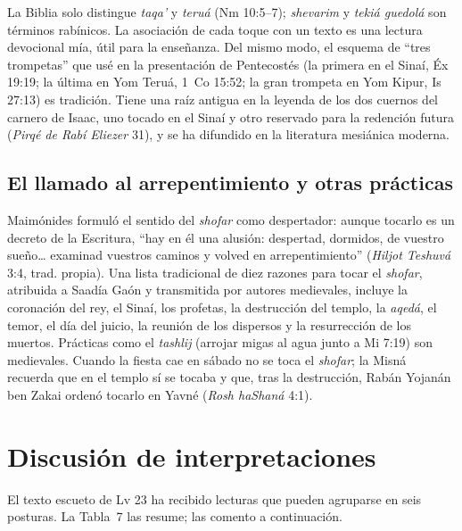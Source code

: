 \documentclass[11pt,letterpaper]{article}
\begin{document}
\begin{nota}[Precisión]
La Biblia solo distingue \emph{taqa'} y \emph{teruá} (Nm 10:5--7); \emph{shevarim} y \emph{tekiá guedolá} son términos rabínicos. La asociación de cada toque con un texto es una lectura devocional mía, útil para la enseñanza. Del mismo modo, el esquema de ``tres trompetas'' que usé en la presentación de Pentecostés (la primera en el Sinaí, Éx 19:19; la última en Yom Teruá, 1~Co 15:52; la gran trompeta en Yom Kipur, Is 27:13) es tradición. Tiene una raíz antigua en la leyenda de los dos cuernos del carnero de Isaac, uno tocado en el Sinaí y otro reservado para la redención futura (\emph{Pirqé de Rabí Eliezer} 31), y se ha difundido en la literatura mesiánica moderna.
\end{nota}

\subsection{El llamado al arrepentimiento y otras prácticas}
Maimónides formuló el sentido del \emph{shofar} como despertador: aunque tocarlo es un decreto de la Escritura, ``hay en él una alusión: despertad, dormidos, de vuestro sueño\ldots{} examinad vuestros caminos y volved en arrepentimiento'' (\emph{Hiljot Teshuvá} 3:4, trad. propia). Una lista tradicional de diez razones para tocar el \emph{shofar}, atribuida a Saadía Gaón y transmitida por autores medievales, incluye la coronación del rey, el Sinaí, los profetas, la destrucción del templo, la \emph{aqedá}, el temor, el día del juicio, la reunión de los dispersos y la resurrección de los muertos. Prácticas como el \emph{tashlij} (arrojar migas al agua junto a Mi 7:19) son medievales. Cuando la fiesta cae en sábado no se toca el \emph{shofar}; la Misná recuerda que en el templo sí se tocaba y que, tras la destrucción, Rabán Yojanán ben Zakai ordenó tocarlo en Yavné (\emph{Rosh haShaná} 4:1).

\section{Discusión de interpretaciones}

El texto escueto de Lv 23 ha recibido lecturas que pueden agruparse en seis posturas. La Tabla~7 las resume; las comento a continuación.
\end{document}

